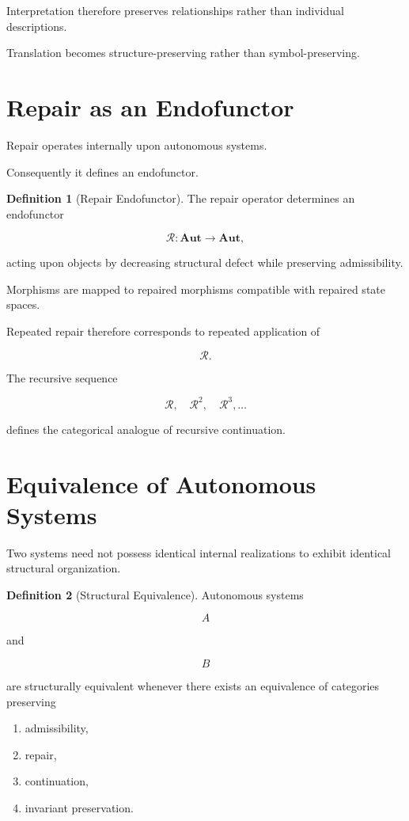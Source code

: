 \documentclass[11pt,oneside]{book}
\numberwithin{equation}{chapter}
\theoremstyle{definition}
\newtheorem{definition}{Definition}[chapter]
\theoremstyle{plain}
\begin{document}
Interpretation therefore preserves relationships rather than individual
descriptions.

Translation becomes structure-preserving rather than symbol-preserving.

\section{Repair as an Endofunctor}

Repair operates internally upon autonomous systems.

Consequently it defines an endofunctor.

\begin{definition}[Repair Endofunctor]

The repair operator determines an endofunctor

\[
\mathcal{R}
:
\mathbf{Aut}
\rightarrow
\mathbf{Aut},
\]

acting upon objects by decreasing structural defect while preserving
admissibility.

Morphisms are mapped to repaired morphisms compatible with repaired state
spaces.

\end{definition}

Repeated repair therefore corresponds to repeated application of

\[
\mathcal{R}.
\]

The recursive sequence

\[
\mathcal{R},
\quad
\mathcal{R}^2,
\quad
\mathcal{R}^3,
\ldots
\]

defines the categorical analogue of recursive continuation.

\section{Equivalence of Autonomous Systems}

Two systems need not possess identical internal realizations to exhibit
identical structural organization.

\begin{definition}[Structural Equivalence]

Autonomous systems

\[
A
\]

and

\[
B
\]

are structurally equivalent whenever there exists an equivalence of
categories preserving

\begin{enumerate}
\item admissibility,
\item repair,
\item continuation,
\item invariant preservation.
\end{enumerate}

\end{definition}
\end{document}
